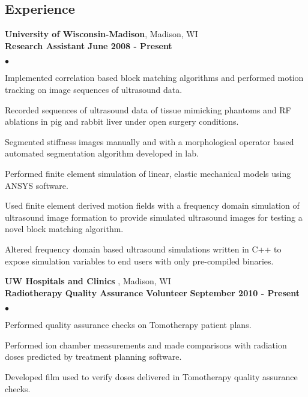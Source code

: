 \documentclass[margin,line]{res}
\newenvironment{list2}{
  \begin{list}{$\bullet$}{%
      \setlength{\itemsep}{0in}
      \setlength{\parsep}{0in} \setlength{\parskip}{0in}
      \setlength{\topsep}{0in} \setlength{\partopsep}{0in}
      \setlength{\leftmargin}{0.2in}}}{\end{list}}
\begin{document}
\begin{resume}
\section{\sc Experience}

{\bf University of Wisconsin-Madison}, Madison, WI \\
{\bf  Research Assistant} \hfill {\bf June 2008 - Present} \\
\vspace{-.2cm}
\begin{list2}
\item Implemented correlation based block matching algorithms and performed motion tracking on image sequences of ultrasound data.
\item Recorded sequences of ultrasound data of tissue mimicking phantoms and RF ablations in pig and rabbit liver under open surgery conditions.
\item Segmented stiffness images manually and with a morphological operator based automated segmentation algorithm developed in lab. 
\item Performed finite element simulation of linear, elastic mechanical models using ANSYS software.
\item Used finite element derived motion fields with a frequency domain simulation of ultrasound image formation
 to provide simulated ultrasound images for testing a novel block matching algorithm. 
\item Altered frequency domain based ultrasound simulations written in C++ to expose simulation variables to end users with only pre-compiled binaries.
\end{list2}

\vspace{.2cm}

{\bf UW Hospitals and Clinics }, Madison, WI \\
{\bf Radiotherapy Quality Assurance Volunteer} \hfill {\bf September 2010 - Present} \\
\vspace{-.2cm}
\begin{list2}
\item Performed quality assurance checks on Tomotherapy patient plans.
\item Performed ion chamber measurements and made comparisons with radiation doses predicted by treatment planning software.
\item Developed film used to verify doses delivered in Tomotherapy quality assurance checks.
\end{list2}


\end{resume}
\end{document}
